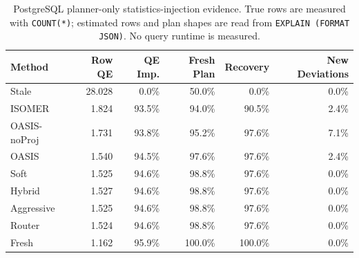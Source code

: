 \begin{table}[t]
  \centering
  \small
  \caption{PostgreSQL planner-only statistics-injection evidence. True rows are measured with \texttt{COUNT(*)}; estimated rows and plan shapes are read from \texttt{EXPLAIN (FORMAT JSON)}. No query runtime is measured.}
  \label{tab:postgres_planner_stats_injection}
  \setlength{\tabcolsep}{4pt}
  \begin{tabular}{lrrrrr}
    \toprule
    Method & Row QE & QE Imp. & Fresh Plan & Recovery & New Deviations \\
    \midrule
    Stale & 28.028 & 0.0\% & 50.0\% & 0.0\% & 0.0\% \\
    ISOMER & 1.824 & 93.5\% & 94.0\% & 90.5\% & 2.4\% \\
    OASIS-noProj & 1.731 & 93.8\% & 95.2\% & 97.6\% & 7.1\% \\
    OASIS & 1.540 & 94.5\% & 97.6\% & 97.6\% & 2.4\% \\
    Soft & 1.525 & 94.6\% & 98.8\% & 97.6\% & 0.0\% \\
    Hybrid & 1.527 & 94.6\% & 98.8\% & 97.6\% & 0.0\% \\
    Aggressive & 1.525 & 94.6\% & 98.8\% & 97.6\% & 0.0\% \\
    Router & 1.524 & 94.6\% & 98.8\% & 97.6\% & 0.0\% \\
    Fresh & 1.162 & 95.9\% & 100.0\% & 100.0\% & 0.0\% \\
    \bottomrule
  \end{tabular}
\end{table}
